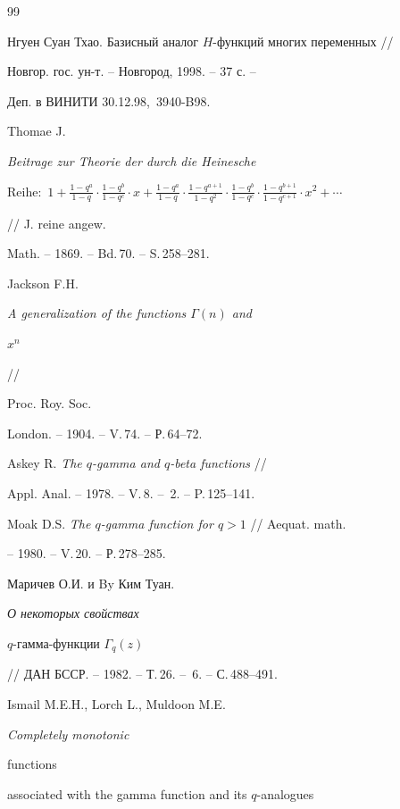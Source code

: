 \begin{thebibliography}{99} 


 




Нгуен Суан Тхао. {Базисный аналог $H$-функций многих переменных} //


Новгор. гос. ун-т. -- Новгород, 1998. -- 37 с. --


Деп. в ВИНИТИ 30.12.98, \No\,3940-B98.




Thomae J. {\em Beitrage zur Theorie der durch die Heinesche 


Reihe$:$ $1+\frac{1-q^a}{1-q}\cdot\frac{1-q^b}{1-q^c}\cdot x+


\frac{1-q^a}{1-q}\cdot\frac{1-q^{a+1}}{1-q^2}\cdot


\frac{1-q^b}{1-q^c}\cdot\frac{1-q^{b+1}}{1-q^{c+1}}\cdot x^2+\dotsb$}


// J. reine angew. 


Math. -- 1869. -- Bd.\,70. -- S.\,258--281. 




Jackson F.H. {\em A generalization of the functions $\Gamma(n)$ and 


$x^n$} // 


Proc. Roy. Soc. 


London. -- 1904. -- V.\,74. -- Р.\,64--72. 




Askey R. {\em The $q$-gamma and $q$-beta functions} // 


Appl. Anal. -- 1978. -- V.\,8. -- \No\,2. -- P.\,125--141. 




Moak D.S. {\em The $q$-gamma function for $q>1$} // Aequat. math. 


-- 1980. -- V.\,20. -- Р.\,278--285. 




Маричев О.И. и By Ким Туан. {\em О некоторых свойствах 


$q$-гамма-функции $\Gamma_q(z)$} 


// ДАН БССР. -- 1982. -- Т.\,26. -- \No\,6. -- С.\,488--491. 




Ismail M.E.H., Lorch L., Muldoon M.E. {\em Completely monotonic 


functions 


associated with the gamma function and its $q$-analogues} 



\end{thebibliography}
